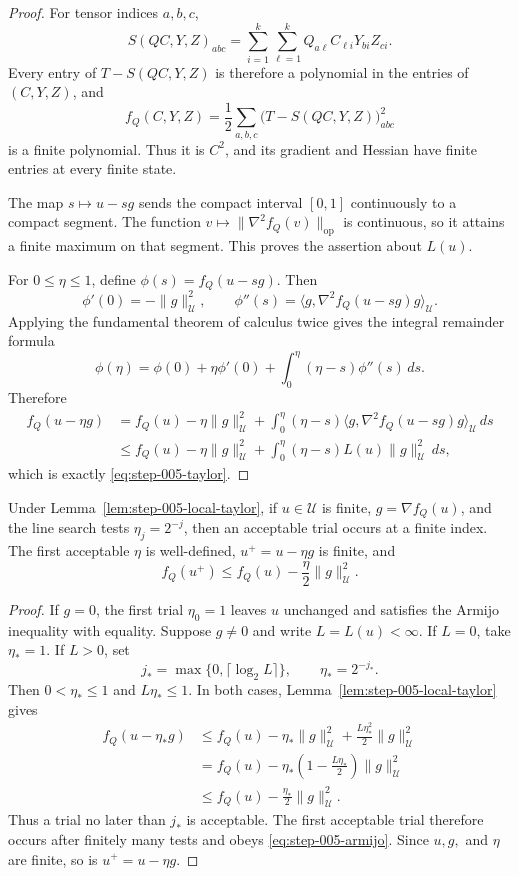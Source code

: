\begin{proof}
For tensor indices $a,b,c$,
\[
 S(QC,Y,Z)_{abc}
 =\sum_{i=1}^k\sum_{\ell=1}^k
 Q_{a\ell}C_{\ell i}Y_{bi}Z_{ci}.
\]
Every entry of $T-S(QC,Y,Z)$ is therefore a polynomial in the entries of
$(C,Y,Z)$, and
\[
 f_Q(C,Y,Z)=\frac12\sum_{a,b,c}
 \bigl(T-S(QC,Y,Z)\bigr)_{abc}^2
\]
is a finite polynomial.  Thus it is $C^2$, and its gradient and Hessian have
finite entries at every finite state.

The map $s\mapsto u-sg$ sends the compact interval $[0,1]$ continuously to
a compact segment.  The function
$v\mapsto\|\nabla^2f_Q(v)\|_{\mathrm{op}}$ is continuous, so it attains a
finite maximum on that segment.  This proves the assertion about $L(u)$.

For $0\le\eta\le1$, define $\phi(s)=f_Q(u-sg)$.  Then
\[
 \phi'(0)=-\|g\|_{\mathcal U}^2,
 \qquad
 \phi''(s)=\langle g,\nabla^2f_Q(u-sg)g\rangle_{\mathcal U}.
\]
Applying the fundamental theorem of calculus twice gives the integral
remainder formula
\[
 \phi(\eta)=\phi(0)+\eta\phi'(0)
 +\int_0^\eta(\eta-s)\phi''(s)\,ds.
\]
Therefore
\[
 \begin{aligned}
 f_Q(u-\eta g)
 &=f_Q(u)-\eta\|g\|_{\mathcal U}^2
 +\int_0^\eta(\eta-s)
 \langle g,\nabla^2f_Q(u-sg)g\rangle_{\mathcal U}\,ds\\
 &\le f_Q(u)-\eta\|g\|_{\mathcal U}^2
 +\int_0^\eta(\eta-s)L(u)\|g\|_{\mathcal U}^2\,ds,
 \end{aligned}
\]
which is exactly \eqref{eq:step-005-taylor}.
\end{proof}

\begin{proposition}\label{prop:step-005-armijo}
Under Lemma~\ref{lem:step-005-local-taylor}, if $u\in\mathcal U$ is finite,
$g=\nabla f_Q(u)$, and the line search tests $\eta_j=2^{-j}$, then an
acceptable trial occurs at a finite index.  The first acceptable $\eta$ is
well-defined, $u^+=u-\eta g$ is finite, and
\[
 f_Q(u^+)\le f_Q(u)-\frac{\eta}{2}\|g\|_{\mathcal U}^2.
 \tag{A.2}\label{eq:step-005-armijo}
\]
\end{proposition}

\begin{proof}
If $g=0$, the first trial $\eta_0=1$ leaves $u$ unchanged and satisfies the
Armijo inequality with equality.  Suppose $g\ne0$ and write $L=L(u)<\infty$.
If $L=0$, take $\eta_*=1$.  If $L>0$, set
\[
 j_*=\max\{0,\lceil\log_2L\rceil\},
 \qquad \eta_*=2^{-j_*}.
\]
Then $0<\eta_*\le1$ and $L\eta_*\le1$.  In both cases,
Lemma~\ref{lem:step-005-local-taylor} gives
\[
 \begin{aligned}
 f_Q(u-\eta_*g)
 &\le f_Q(u)-\eta_*\|g\|_{\mathcal U}^2
 +\frac{L\eta_*^2}{2}\|g\|_{\mathcal U}^2\\
 &=f_Q(u)-\eta_*
 \left(1-\frac{L\eta_*}{2}\right)\|g\|_{\mathcal U}^2\\
 &\le f_Q(u)-\frac{\eta_*}{2}\|g\|_{\mathcal U}^2.
 \end{aligned}
\]
Thus a trial no later than $j_*$ is acceptable.  The first acceptable trial
therefore occurs after finitely many tests and obeys
\eqref{eq:step-005-armijo}.  Since $u,g,$ and $\eta$ are finite, so is
$u^+=u-\eta g$.
\end{proof}

